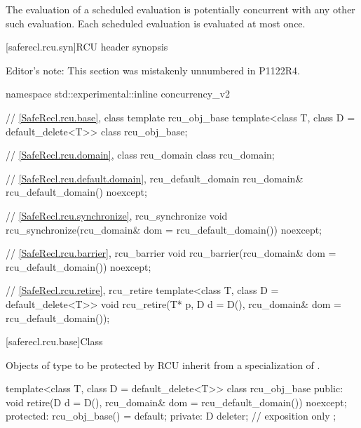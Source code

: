 \pnum
The evaluation of a scheduled evaluation is potentially concurrent with
any other such evaluation. Each scheduled evaluation is evaluated at
most once.

[saferecl.rcu.syn]{RCU header  synopsis}

Editor's note: This section was mistakenly unnumbered in P1122R4.


\begin{codeblock}
namespace std::experimental::inline concurrency_v2 {
  // \ref{SafeRecl.rcu.base}, class template rcu_obj_base
  template<class T, class D = default_delete<T>>
    class rcu_obj_base;

  // \ref{SafeRecl.rcu.domain}, class rcu_domain
  class rcu_domain;

  // \ref{SafeRecl.rcu.default.domain}, rcu_default_domain
  rcu_domain& rcu_default_domain() noexcept;

  // \ref{SafeRecl.rcu.synchronize}, rcu_synchronize
  void rcu_synchronize(rcu_domain& dom = rcu_default_domain()) noexcept;

  // \ref{SafeRecl.rcu.barrier}, rcu_barrier
  void rcu_barrier(rcu_domain& dom = rcu_default_domain()) noexcept;

  // \ref{SafeRecl.rcu.retire}, rcu_retire
  template<class T, class D = default_delete<T>>
    void rcu_retire(T* p, D d = D(), rcu_domain& dom = rcu_default_domain());
}
\end{codeblock}

[saferecl.rcu.base]{Class }


Objects of type  to be protected by RCU inherit from a
specialization of .


\begin{codeblock}
template<class T, class D = default_delete<T>>
class rcu_obj_base {
public:
  void retire(D d = D(), rcu_domain& dom = rcu_default_domain()) noexcept;
protected:
  rcu_obj_base() = default;
private:
  D deleter;  // exposition only
};
\end{codeblock}

